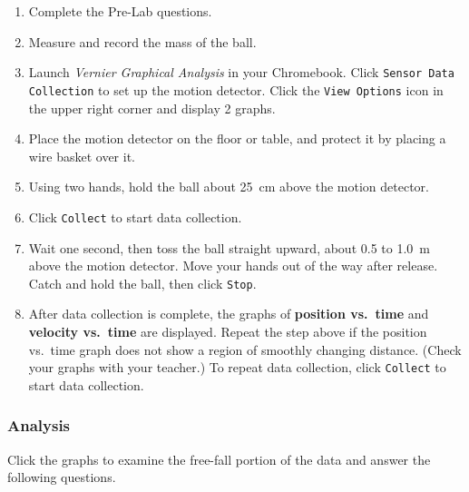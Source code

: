 \documentclass{article}
\numberwithin{equation}{section}
\numberwithin{figure}{section}
\begin{document}
\begin{enumerate}
\setlength\itemsep{-1ex}
    \item Complete the Pre-Lab questions.
    \item Measure and record the mass of the ball. 
    \item Launch \textit{Vernier Graphical Analysis} in your Chromebook. Click \texttt{Sensor Data Collection} to set up the motion detector. Click the \texttt{View Options} icon in the upper right corner and display 2 graphs.
    \item Place the motion detector on the floor or table, and protect it by placing a wire basket over it. 
    \item Using two hands, hold the ball about \SI{25}{cm} above the motion detector. 
    \item Click \texttt{Collect} to start data collection.
    \item Wait one second, then toss the ball straight upward, about 0.5 to \SI{1.0}{m} above the motion detector. Move your hands out of the way after release. Catch and hold the ball, then click \texttt{Stop}.
    \item After data collection is complete, the graphs of \textbf{position vs.~time} and \textbf{velocity vs.~time} are displayed. Repeat the step above if the position vs.~time graph does not show a region of smoothly changing distance. (Check your graphs with your teacher.) To repeat data collection, click \texttt{Collect} to start data collection.
\end{enumerate}


\subsubsection*{Analysis}
Click the graphs to examine the free-fall portion of the data and answer the following questions.
\end{document}
